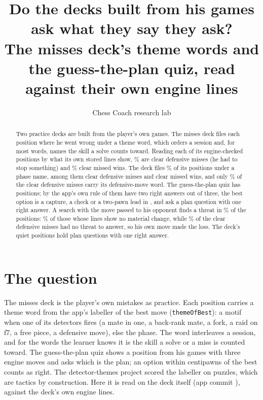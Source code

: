 \documentclass[11pt]{article}
\title{Do the decks built from his games ask what they say they ask?\\[0.3em]
\large The misses deck's theme words and the guess-the-plan quiz, read against their own engine lines}
\author{Chess Coach research lab}
\date{}
\begin{document}
\maketitle

\begin{abstract}
Two practice decks are built from the player's own games. The misses deck files each position
where he went wrong under a theme word, which orders a session and, for most words, names the
skill a solve counts toward. Reading each of its \Scored{} engine-checked positions by what its
own stored lines show, \DefensiveShare\% are clear defensive misses (he had to stop something)
and \AttackingShare\% clear missed wins. The deck files \PhaseShare\% of its positions under a
phase name, among them \PhaseDefensive{} clear defensive misses and \PhaseAttacking{} clear
missed wins, and only \DefRecall\% of the clear defensive misses carry its defensive-move word.
The guess-the-plan quiz has \Quizzes{} positions; by the app's own rule \TwoRight{} of them have
two right answers out of three, the best option is a capture, a check or a two-pawn lead in
\ForcingOrMaterial, and \PlanQuestions{} ask a plan question with one right answer. A search with
the move passed to his opponent finds a threat in \ThreatShare\% of the positions: \NeitherThreatShare\%
of those whose lines show no material change, while \SelfShare\% of the clear defensive misses had no
threat to answer, so his own move made the loss. The deck's \Quiet{} quiet positions hold
\QuietQuiz{} plan questions with one right answer.
\end{abstract}

\section{The question}

The misses deck is the player's own mistakes as practice. Each position carries a theme word
from the app's labeller of the best move (\texttt{themeOfBest}): a motif when one of its detectors
fires (a mate in one, a back-rank mate, a fork, a raid on f7, a free piece, a defensive move),
else the phase. The word interleaves a session, and for the words the learner knows it is the
skill a solve or a miss is counted toward. The guess-the-plan quiz shows a position from his
games with three engine moves and asks which is the plan; an option within \Margin{} centipawns
of the best counts as right. The detector-themes project scored the labeller on puzzles, which
are tactics by construction. Here it is read on the deck itself (app commit
\texttt{\AppCommit}), against the deck's own engine lines.
\end{document}
